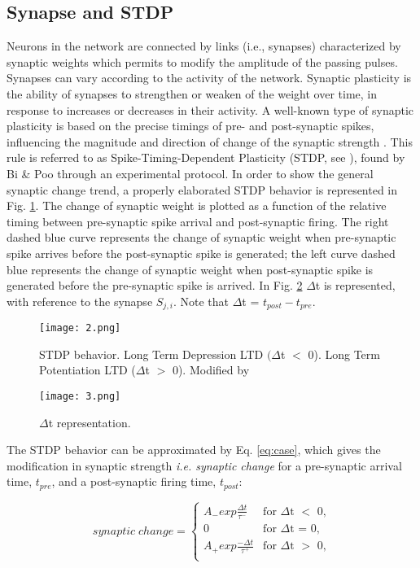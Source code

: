 \documentclass[review]{elsarticle}
\begin{document}
\subsection{Synapse and STDP} 
\label{e}
Neurons in the network are connected by links (i.e., synapses) characterized by synaptic weights which permits to modify the amplitude of the passing pulses. Synapses can vary according to the activity of the network.
Synaptic plasticity is the ability of synapses to strengthen or weaken of the weight over time, in response to increases or decreases in their activity. A well-known type of synaptic plasticity is based on the precise timings of pre- and post-synaptic spikes, influencing the magnitude and direction of change of the synaptic strength \cite{Sinha}.
This rule is referred to as Spike-Timing-Dependent Plasticity (STDP, see \cite{Bi1998}), found by Bi \& Poo through an experimental protocol. In order to show the general synaptic change trend, a properly elaborated STDP behavior is represented in Fig. \ref{F:STDP1}. The change of synaptic weight is plotted as a function of the relative timing between pre-synaptic spike arrival and post-synaptic firing. The right dashed blue curve represents the change of synaptic weight when pre-synaptic spike arrives before the post-synaptic spike is generated; the left curve dashed blue represents the change of synaptic weight when post-synaptic spike is generated before the pre-synaptic spike is arrived. In Fig. \ref{F:delta}  $\Delta$t is represented, with reference to the synapse $S_{j,i}$. Note that  $\Delta$t = $t_{post} - t_{pre}$.

\begin{figure}[!ht]
\centering
\texttt{[image: 2.png]}
 \caption{STDP behavior. Long Term Depression LTD $(\Delta$t $<$ 0).
 Long Term Potentiation LTD ($\Delta$t $>$ 0). 
 Modified by \cite{Bi1998} }
\label{F:STDP1}
\end{figure}

\begin{figure}[!ht]
\centering
\texttt{[image: 3.png]}
 \caption{ $\Delta$t representation.}
\label{F:delta}
\end{figure}

The STDP behavior can be approximated by Eq. \ref{eq:case}, which gives the modification in synaptic strength \emph{i.e. synaptic change} for a pre-synaptic arrival time, $t_{pre}$, and a post-synaptic firing time, $t_{post}$:


\begin{equation}
\label{eq:case}
synaptic\;change =\begin {cases}
 A_{-}exp \frac{\Delta t}{\tau^{-}} & \text{for $\Delta$t $<$ 0,}\\
0 & \text{for $\Delta$t = 0,}\\
A_{+}exp \frac{-\Delta t}{\tau^{+}} & \text{for $\Delta$t $>$ 0,}\\
\end{cases}
\end{equation}
\end{document}

